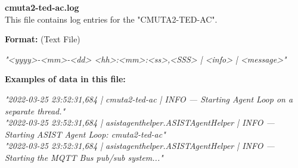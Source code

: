 \begin{description}
\begin{addmargin}[0em]{0em}
    \label{cmuta2-ted-ac.log}
    \begin{addmargin}[1em]{0em} %
        \textbf{cmuta2-ted-ac.log}\\
        This file contains log entries for the "CMUTA2-TED-AC".
        \begin{addmargin}[1em]{0em}
            \textbf{Format:} (Text File)
            \begin{addmargin}[1em]{0em}
                \textit{"<yyyy>-<mm>-<dd> <hh>:<mm>:<ss>,<SSS> | <info> | <message>"}
            \end{addmargin}
        \end{addmargin}
        \begin{addmargin}[1em]{0em}
            \textbf{Examples of data in this file:}
            \begin{addmargin}[1em]{0em}\textit{"2022-03-25 23:52:31,684 | cmuta2-ted-ac | INFO — Starting Agent Loop on a separate thread."\\
                "2022-03-25 23:52:31,684 | asistagenthelper.ASISTAgentHelper | INFO — Starting ASIST Agent Loop: cmuta2-ted-ac"\\
                "2022-03-25 23:52:31,684 | asistagenthelper.ASISTAgentHelper | INFO — Starting the MQTT Bus pub/sub system..."}
            \end{addmargin}
        \end{addmargin}
    \end{addmargin} %
    \textbf{\\}


\end{addmargin}
\end{description}
